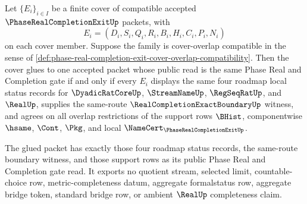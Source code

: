\begin{theorem}
\label{thm:phase-real-completion-exit-finite-cover-gate-gluing}
Let $\{E_i\}_{i \in I}$ be a finite cover of compatible accepted $\PhaseRealCompletionExitUp$ packets, with
$$
E_i=(D_i,S_i,Q_i,R_i,B_i,H_i,C_i,P_i,N_i)
$$
on each cover member. Suppose the family is cover-overlap compatible in the sense of \autoref{def:phase-real-completion-exit-cover-overlap-compatibility}. Then the cover glues to one accepted packet whose public read is the same Phase Real and Completion gate if and only if every $E_i$ displays the same four roadmap local status records for $\DyadicRatCoreUp$, $\StreamNameUp$, $\RegSeqRatUp$, and $\RealUp$, supplies the same-route $\RealCompletionExactBoundaryUp$ witness, and agrees on all overlap restrictions of the support rows $\BHist$, componentwise $\hsame$, $\Cont$, $\Pkg$, and local $\NameCert_{\PhaseRealCompletionExitUp}$.

The glued packet has exactly those four roadmap status records, the same-route boundary witness, and those support rows as its public Phase Real and Completion gate read. It exports no quotient stream, selected limit, countable-choice row, metric-completeness datum, aggregate formalstatus row, aggregate bridge token, standard bridge row, or ambient $\RealUp$ completeness claim.
\end{theorem}
